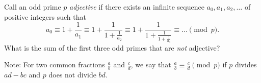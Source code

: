 Call an odd prime $p$ \emph{adjective} if there exists an infinite sequence $a_0,a_1,a_2,\ldots$ of positive integers such that \[a_0\equiv1+\frac{1}{a_1}\equiv1+\frac{1}{1+\frac{1}{a_2}}\equiv1+\frac{1}{1+\frac{1}{1+\frac{1}{a_3}}}\equiv\ldots\pmod p.\] What is the sum of the first three odd primes that are \emph{not} adjective?

Note: For two common fractions $\frac{a}{b}$ and $\frac{c}{d}$, we say that $\frac{a}{b}\equiv\frac{c}{d}\pmod p$ if $p$ divides $ad-bc$ and $p$ does not divide $bd$.